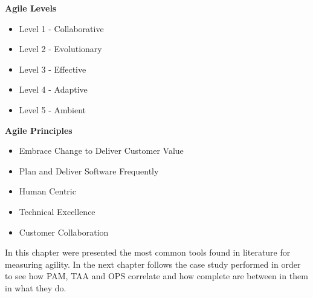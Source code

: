 \begin{minipage}[t]{0.35\linewidth}
    \textbf{Agile Levels}
    \begin{itemize}
    \item{Level 1 - Collaborative}
    \item{Level 2 - Evolutionary}
    \item{Level 3 - Effective}
    \item{Level 4 - Adaptive}
    \item{Level 5 - Ambient}
    \end{itemize}
    \end{minipage}
    \begin{minipage}[t]{0.6\linewidth}
    \textbf{Agile Principles}
    \begin{itemize}
    \item{Embrace Change to Deliver Customer Value}
    \item{Plan and Deliver Software Frequently}
    \item{Human Centric}
    \item{Technical Excellence}
    \item{Customer Collaboration}
    \end{itemize}
\end{minipage}

In this chapter were presented the most common tools found in literature for measuring agility. In the next chapter follows the case study performed in order to see how PAM, TAA and OPS correlate and how complete are between in them in what they do.

%
%
%
%
